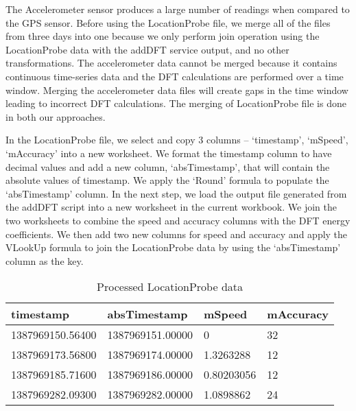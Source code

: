 The Accelerometer sensor produces a large number of readings when compared to the GPS sensor. Before using the LocationProbe file, we merge all of the files from three days into one because we only perform join operation using the LocationProbe data with the addDFT service output, and no other transformations. The accelerometer data cannot be merged because it contains continuous time-series data and the DFT calculations are performed over a time window. Merging the accelerometer data files will create gaps in the time window leading to incorrect DFT calculations. The merging of LocationProbe file is done in both our approaches. 


In the LocationProbe file, we select and copy 3 columns – `timestamp', `mSpeed', `mAccuracy' into a new worksheet. We format the timestamp column to have decimal values and add a new column, `absTimestamp', that will contain the absolute values of timestamp. We apply the `Round' formula to populate the `absTimestamp' column. In the next step, we load the output file generated from the addDFT script into a new worksheet in the current workbook. We join the two worksheets to combine the speed and accuracy columns with the DFT energy coefficients. We then add two new columns for speed and accuracy and apply the VLookUp formula to join the LocationProbe data by using the `absTimestamp' column as the key.

\begin{table}[h]
	\centering	
	\caption{Processed LocationProbe data \label{tab:processed_location_data}}
  	\begin{tabular}{ | p{2cm} | p{2cm} | p{1cm} | p{1.5cm} | }
    	\hline
	    \textbf{timestamp} & \textbf{absTimestamp} & \textbf{mSpeed} & \textbf{mAccuracy} \\ \hline
	    1387969150.56400 & 1387969151.00000 & 0 & 32 \\ \hline
 		1387969173.56800 & 1387969174.00000 & 1.3263288 & 12 \\ \hline
 		1387969185.71600 & 1387969186.00000 & 0.80203056 & 12 \\ \hline
 		1387969282.09300 & 1387969282.00000 & 1.0898862 & 24 \\
	    \hline
  	\end{tabular}
\end{table}

